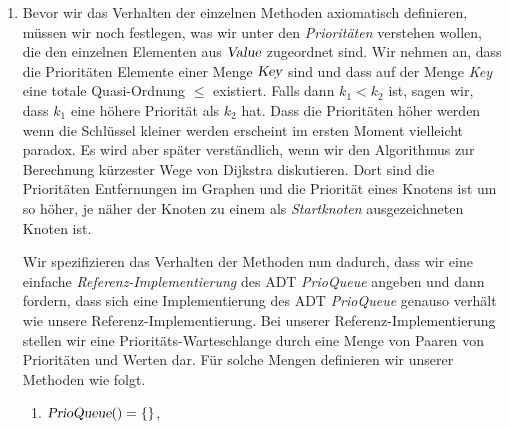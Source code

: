 \begin{Definition}
{\begin{enumerate}
\begin{enumerate}
              Der Aufruf $Q.\textsl{insert}(k,v)$ f\"ugt das Element $v$ mit der Priorit\"at $k$ in
              die Priorit\"ats-Warteschlange $Q$ ein.  
        \item $\textsl{remove}: \textsl{PrioQueue} \rightarrow \textsl{PrioQueue}$

              Der Aufruf $Q.\textsl{remove}()$ entfernt aus der Priorit\"ats-Warteschlange
              $Q$ ein Element, das eine maximale Priorit\"at hat.
        \item $\textsl{change}: \textsl{PrioQueue} \times \textsl{Key} \times \textsl{Value} \rightarrow \textsl{PrioQueue}$

              Der Aufruf $Q.\textsl{change}(k,v)$ \"andert die Priorit\"at des Elements $v$ in
              der Priorit\"ats-Warte\-schlange $Q$ so ab, dass
              $k$ die neue Priorit\"at dieses Elements ist. 
              Wir setzen dabei voraus, dass einerseits dass Element $v$ in der
              Priorit\"ats-Warteschlange $Q$ auftritt und dass andererseits die neue
              Priorit\"at mindestens so hoch ist wie die Priorit\"at, die $v$
              vorher hatte.
        \end{enumerate}
\item Bevor wir das Verhalten der einzelnen Methoden axiomatisch definieren, m\"ussen wir
      noch festlegen, was wir unter den \emph{Priorit\"aten} verstehen wollen, die den
      einzelnen Elementen aus $\textsl{Value}$ zugeordnet sind.  Wir nehmen an, dass die
      Priorit\"aten Elemente einer Menge $\textsl{Key}$ sind und dass auf der Menge \textsl{Key}
      eine totale Quasi-Ordnung $\leq$ existiert. Falls dann $k_1 < k_2$ ist, sagen wir, 
      dass $k_1$ eine h\"ohere Priorit\"at als $k_2$ hat.  Dass die Priorit\"aten h\"oher
      werden wenn die Schl\"ussel kleiner werden erscheint im ersten Moment vielleicht
      paradox. Es wird aber sp\"ater verst\"andlich, wenn wir den Algorithmus zur
      Berechnung k\"urzester Wege von Dijkstra diskutieren. Dort sind die Priorit\"aten
      Entfernungen im Graphen und die Priorit\"at eines Knotens ist um so h\"oher, je n\"aher
      der Knoten zu einem als \emph{Startknoten} ausgezeichneten Knoten ist. 

      Wir spezifizieren das Verhalten der Methoden nun dadurch, dass wir eine einfache
      \emph{Referenz-Implementierung} des ADT \textsl{PrioQueue} angeben und dann fordern,
      dass sich eine Implementierung des ADT \textsl{PrioQueue} genauso verh\"alt wie unsere
      Referenz-Implementierung.  Bei unserer Referenz-Implementierung stellen wir eine
      Priorit\"ats-Warteschlange durch eine Menge von Paaren von Priorit\"aten und Werten 
      dar.   F\"ur solche Mengen definieren wir unserer Methoden wie folgt.
      \begin{enumerate}
      \item $\textsl{PrioQueue}() = \{\}$,


\end{enumerate}
\end{enumerate}}
\end{Definition}
